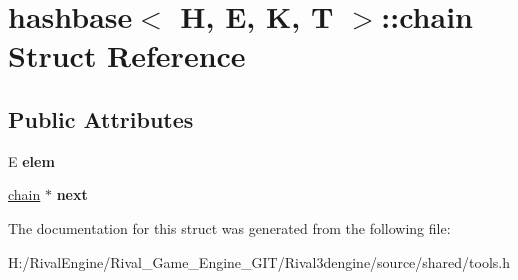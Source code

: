 \hypertarget{structhashbase_1_1chain}{}\section{hashbase$<$ H, E, K, T $>$\+:\+:chain Struct Reference}
\label{structhashbase_1_1chain}
\subsection*{Public Attributes}
\begin{DoxyCompactItemize}
\item 
\mbox{\label{structhashbase_1_1chain_aa54852d503a810822fd03df77c0d8340}} 
E {\bfseries elem}
\item 
\mbox{\label{structhashbase_1_1chain_a66870b922c08badcff3ead1087b09cf1}} 
\hyperlink{structhashbase_1_1chain}{chain} $\ast$ {\bfseries next}
\end{DoxyCompactItemize}


The documentation for this struct was generated from the following file\+:\begin{DoxyCompactItemize}
\item 
H\+:/\+Rival\+Engine/\+Rival\+\_\+\+Game\+\_\+\+Engine\+\_\+\+G\+I\+T/\+Rival3dengine/source/shared/tools.\+h\end{DoxyCompactItemize}
